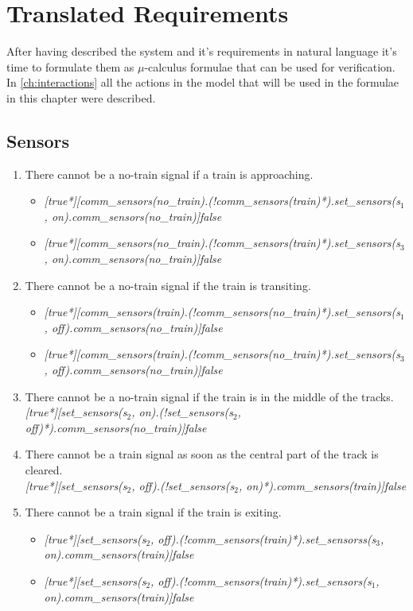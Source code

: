 \documentclass[final]{report}
\begin{document}
\chapter{Translated Requirements}
After having described the system and it's requirements in natural language it's time to formulate them as $\mu$-calculus formulae that can be used for verification. In \cref{ch:interactions} all the actions in the model that will be used in the formulae in this chapter were described.

\section{Sensors}
\begin{enumerate}
\item There cannot be a no-train signal if a train is approaching.
\begin{itemize}
\item \textit{[true*][comm\_sensors(no\_train).(!comm\_sensors(train)*).set\_sensors(s$_{1}$, on).comm\_sensors(no\_train)]false}
\item \textit{[true*][comm\_sensors(no\_train).(!comm\_sensors(train)*).set\_sensors(s$_{3}$, on).comm\_sensors(no\_train)]false} 
\end{itemize}

\item There cannot be a no-train signal if the train is transiting.
\begin{itemize}
\item \textit{[true*][comm\_sensors(train).(!comm\_sensors(no\_train)*).set\_sensors(s$_{1}$, off).comm\_sensors(no\_train)]false}
\item \textit{[true*][comm\_sensors(train).(!comm\_sensors(no\_train)*).set\_sensors(s$_{3}$, off).comm\_sensors(no\_train)]false}
\end{itemize}

\item There cannot be a no-train signal if the train is in the middle of the tracks.\\
\textit{[true*][set\_sensors(s$_{2}$, on).(!set\_sensors(s$_{2}$, off)*).comm\_sensors(no\_train)]false}

\item There cannot be a train signal as soon as the central part of the track is cleared.\\
\textit{[true*][set\_sensors(s$_{2}$, off).(!set\_sensors(s$_{2}$, on)*).comm\_sensors(train)]false
}

\item There cannot be a train signal if the train is exiting.
\begin{itemize}
\item \textit{[true*][set\_sensors(s$_{2}$, off).(!comm\_sensors(train)*).set\_sensorss(s$_{3}$, on).comm\_sensors(train)]false}
\item \textit{[true*][set\_sensors(s$_{2}$, off).(!comm\_sensors(train)*).set\_sensors(s$_{1}$, on).comm\_sensors(train)]false}
\end{itemize}


\end{enumerate}
\end{document}
